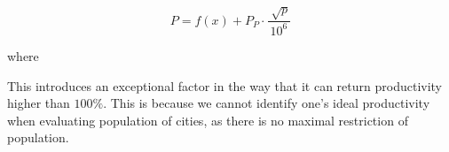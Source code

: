$$P = f(x) + P_P \cdot \frac{\sqrt[]{p}}{10^6}$$

\noindent where 

This introduces an exceptional factor in the way that it can return productivity higher than $100\%$. This is because we cannot identify one's ideal productivity when evaluating population of cities, as there is no maximal restriction of population.
